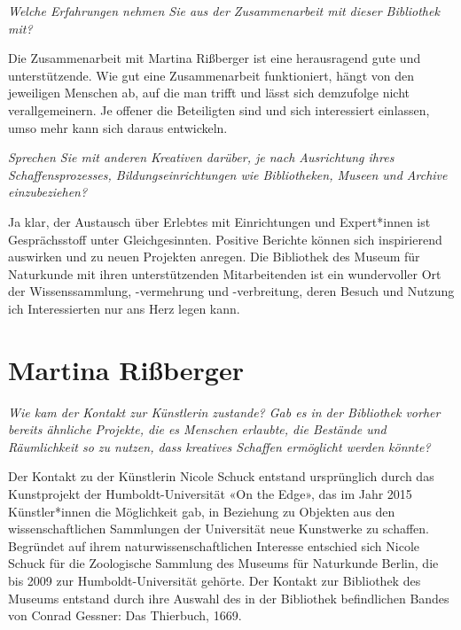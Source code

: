 \documentclass[a4paper,
fontsize=11pt,
oneside,
numbers=noperiodatend,
parskip=half-,
bibliography=totoc,
final
]{scrartcl}
\begin{document}
\emph{Welche Erfahrungen nehmen Sie aus der Zusammenarbeit mit dieser
Bibliothek mit?}

Die Zusammenarbeit mit Martina Rißberger ist eine herausragend gute und
unterstützende. Wie gut eine Zusammenarbeit funktioniert, hängt von den
jeweiligen Menschen ab, auf die man trifft und lässt sich demzufolge
nicht verallgemeinern. Je offener die Beteiligten sind und sich
interessiert einlassen, umso mehr kann sich daraus entwickeln.

\emph{Sprechen Sie mit anderen Kreativen darüber, je nach Ausrichtung
ihres Schaffensprozesses, Bildungseinrichtungen wie Bibliotheken, Museen
und Archive einzubeziehen?}

Ja klar, der Austausch über Erlebtes mit Einrichtungen und Expert*innen
ist Gesprächsstoff unter Gleichgesinnten. Positive Berichte können sich
inspirierend auswirken und zu neuen Projekten anregen. Die Bibliothek
des Museum für Naturkunde mit ihren unterstützenden Mitarbeitenden ist
ein wundervoller Ort der Wissenssammlung, -vermehrung und -verbreitung,
deren Besuch und Nutzung ich Interessierten nur ans Herz legen kann.

\hypertarget{martina-riuxdfberger}{%
\section{Martina Rißberger}\label{martina-riuxdfberger}}

\emph{Wie kam der Kontakt zur Künstlerin zustande? Gab es in der
Bibliothek vorher bereits ähnliche Projekte, die es Menschen erlaubte,
die Bestände und Räumlichkeit so zu nutzen, dass kreatives Schaffen
ermöglicht werden könnte?}

Der Kontakt zu der Künstlerin Nicole Schuck entstand ursprünglich durch
das Kunstprojekt der Humboldt-Universität «On the Edge», das im Jahr
2015 Künstler*innen die Möglichkeit gab, in Beziehung zu Objekten aus
den wissenschaftlichen Sammlungen der Universität neue Kunstwerke zu
schaffen. Begründet auf ihrem naturwissenschaftlichen Interesse
entschied sich Nicole Schuck für die Zoologische Sammlung des Museums
für Naturkunde Berlin, die bis 2009 zur Humboldt-Universität gehörte.
Der Kontakt zur Bibliothek des Museums entstand durch ihre Auswahl des
in der Bibliothek befindlichen Bandes von Conrad Gessner: Das Thierbuch,
1669.
\end{document}
